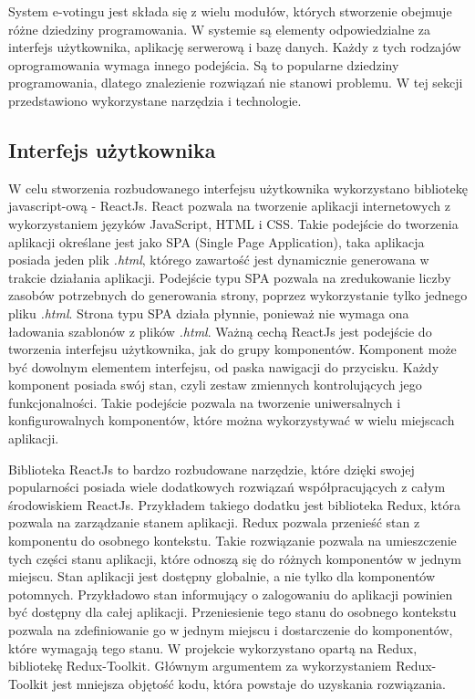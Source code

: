 \documentclass[a4paper,12pt]{book}
\begin{document}
System e-votingu jest składa się z wielu modułów, których stworzenie obejmuje różne dziedziny programowania. W systemie są elementy odpowiedzialne za interfejs użytkownika, aplikację serwerową i bazę danych. Każdy z tych rodzajów oprogramowania wymaga innego podejścia. Są to popularne dziedziny programowania, dlatego znalezienie rozwiązań nie stanowi problemu. W tej sekcji przedstawiono wykorzystane narzędzia i technologie.

\subsection{Interfejs użytkownika}

W celu stworzenia rozbudowanego interfejsu użytkownika wykorzystano bibliotekę javascript-ową - ReactJs. React pozwala na tworzenie aplikacji internetowych z wykorzystaniem języków JavaScript, HTML i CSS. Takie podejście do tworzenia aplikacji określane jest jako SPA (Single Page Application), taka aplikacja posiada jeden plik \textit{.html}, którego zawartość jest dynamicznie generowana w trakcie działania aplikacji. Podejście typu SPA pozwala na zredukowanie liczby zasobów potrzebnych do generowania strony, poprzez wykorzystanie tylko jednego pliku \textit{.html}. Strona typu SPA działa płynnie, ponieważ nie wymaga ona ładowania szablonów z plików \textit{.html}. Ważną cechą ReactJs jest podejście do tworzenia interfejsu użytkownika, jak do grupy komponentów. Komponent może być dowolnym elementem interfejsu, od paska nawigacji do przycisku. Każdy komponent posiada swój stan, czyli zestaw zmiennych kontrolujących jego funkcjonalności. Takie podejście pozwala na tworzenie uniwersalnych i konfigurowalnych komponentów, które można wykorzystywać w wielu miejscach aplikacji.

Biblioteka ReactJs to bardzo rozbudowane narzędzie, które dzięki swojej popularności posiada wiele dodatkowych rozwiązań współpracujących z całym środowiskiem ReactJs. Przykładem takiego dodatku jest biblioteka Redux, która pozwala na zarządzanie stanem aplikacji. Redux pozwala przenieść stan z komponentu do osobnego kontekstu. Takie rozwiązanie pozwala na umieszczenie tych części stanu aplikacji, które odnoszą się do różnych komponentów w jednym miejscu. Stan aplikacji jest dostępny globalnie, a nie tylko dla komponentów potomnych. Przykładowo stan informujący o zalogowaniu do aplikacji powinien być dostępny dla całej aplikacji. Przeniesienie tego stanu do osobnego kontekstu pozwala na zdefiniowanie go w jednym miejscu i dostarczenie do komponentów, które wymagają tego stanu. W projekcie wykorzystano opartą na Redux, bibliotekę Redux-Toolkit. Głównym argumentem za wykorzystaniem Redux-Toolkit jest mniejsza objętość kodu, która powstaje do uzyskania rozwiązania.
\end{document}

